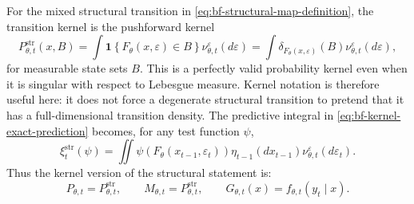 For the mixed structural transition in
\eqref{eq:bf-structural-map-definition}, the transition kernel is the pushforward
kernel
\begin{equation}
  P_{\theta,t}^{\mathrm{str}}(x,B)
  =
  \int
  \mathbf 1\!\left\{F_\theta(x,\varepsilon)\in B\right\}
  \nu_{\theta,t}^{\varepsilon}(d\varepsilon)
  =
  \int
  \delta_{F_\theta(x,\varepsilon)}(B)
  \nu_{\theta,t}^{\varepsilon}(d\varepsilon),
  \label{eq:bf-structural-transition-kernel}
\end{equation}
for measurable state sets $B$.  This is a perfectly valid probability kernel
even when it is singular with respect to Lebesgue measure.  Kernel notation is
therefore useful here: it does not force a degenerate structural transition to
pretend that it has a full-dimensional transition density.  The predictive
integral in \eqref{eq:bf-kernel-exact-prediction} becomes, for any test function
$\psi$,
\begin{equation}
  \xi_t^{\mathrm{str}}(\psi)
  =
  \iint
  \psi\!\left(F_\theta(x_{t-1},\varepsilon_t)\right)
  \eta_{t-1}(dx_{t-1})
  \nu_{\theta,t}^{\varepsilon}(d\varepsilon_t).
  \label{eq:bf-structural-kernel-prediction-test-function}
\end{equation}
Thus the kernel version of the structural statement is:
\[
  P_{\theta,t}=P_{\theta,t}^{\mathrm{str}},
  \qquad
  M_{\theta,t}=P_{\theta,t}^{\mathrm{str}},
  \qquad
  G_{\theta,t}(x)=f_{\theta,t}(y_t\mid x).
\]

